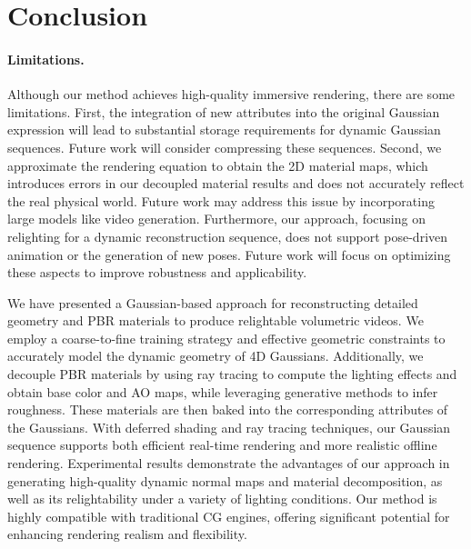 
\section {Conclusion} 
\paragraph{Limitations.}
Although our method achieves high-quality immersive rendering, there are some limitations. 
First, the integration of new attributes into the original Gaussian expression will lead to substantial storage requirements for dynamic Gaussian sequences. Future work will consider compressing these sequences.
Second, we approximate the rendering equation to obtain the 2D material maps, which introduces errors in our decoupled material results and does not accurately reflect the real physical world.
Future work may address this issue by incorporating large models like video generation. Furthermore, our approach, focusing on relighting for a dynamic reconstruction sequence, does not support pose-driven animation or the generation of new poses. Future work will focus on optimizing these aspects to improve robustness and applicability.

We have presented a Gaussian-based approach for reconstructing detailed geometry and PBR materials to produce relightable volumetric videos. We employ a coarse-to-fine training strategy and effective geometric constraints to accurately model the dynamic geometry of 4D Gaussians. Additionally, we decouple PBR materials by using ray tracing to compute the lighting effects and obtain base color and AO maps, while leveraging generative methods to infer roughness. These materials are then baked into the corresponding attributes of the Gaussians. With deferred shading and ray tracing techniques, our Gaussian sequence supports both efficient real-time rendering and more realistic offline rendering. Experimental results demonstrate the advantages of our approach in generating high-quality dynamic normal maps and material decomposition, as well as its relightability under a variety of lighting conditions. Our method is highly compatible with traditional CG engines, offering significant potential for enhancing rendering realism and flexibility.






